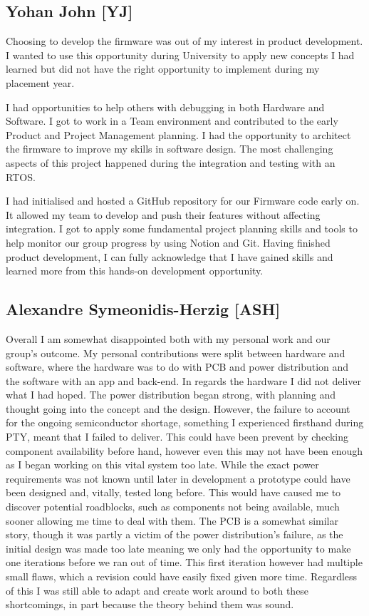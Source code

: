 \subsection{Yohan John [YJ]}
Choosing to develop the firmware was out of my interest in product development.
I wanted to use this opportunity during University to apply new concepts I had learned but did not have the right opportunity to implement during my placement year.

I had opportunities to help others with debugging in both Hardware and Software.
I got to work in a Team environment and contributed to the early Product and Project Management planning.
I had the opportunity to architect the firmware to improve my skills in software design.
The most challenging aspects of this project happened during the integration and testing with an RTOS.

I had initialised and hosted a GitHub repository for our Firmware code early on.
It allowed my team to develop and push their features without affecting integration.
I got to apply some fundamental project planning skills and tools to help monitor our group progress by using Notion and Git.
Having finished product development, I can fully acknowledge that I have gained skills and learned more from this hands-on development opportunity.


\subsection{Alexandre Symeonidis-Herzig [ASH]}
Overall I am somewhat disappointed both with my personal work and our group's outcome.
My personal contributions were split between hardware and software, where the hardware was to do with PCB and power distribution and the software with an app and back-end.
In regards the hardware I did not deliver what I had hoped.
The power distribution began strong, with planning and thought going into the concept and the design.
However, the failure to account for the ongoing semiconductor shortage, something I experienced firsthand during PTY, meant that I failed to deliver.
This could have been prevent by checking component availability before hand, however even this may not have been enough as I began working on this vital system too late.
While the exact power requirements was not known until later in development a prototype could have been designed and, vitally, tested long before.
This would have caused me to discover potential roadblocks, such as components not being available, much sooner allowing me time to deal with them.
The PCB is a somewhat similar story, though it was partly a victim of the power distribution's failure,
as the initial design was made too late meaning we only had the opportunity to make one iterations before we ran out of time.
This first iteration however had multiple small flaws, which a revision could have easily fixed given more time.
Regardless of this I was still able to adapt and create work around to both these shortcomings, in part because the theory behind them was sound.

